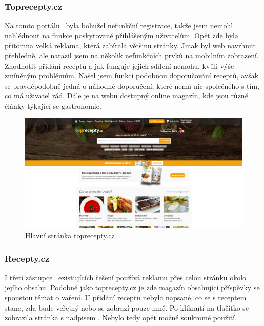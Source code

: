 \subsubsection{Toprecepty.cz}

Na tomto portálu~\cite{TopreceptyCZ} byla bohužel nefunkční registrace, takže jsem nemohl nahlédnout na funkce poskytované přihlášeným
uživatelům. Opět zde byla přítomna velká reklama, která zabírala většinu stránky. Jinak byl web navrhnut přehledně,
ale narazil jsem na několik nefunkčních prvků na mobilním zobrazení. Zhodnotit přidání receptů a jak funguje jejich
sdílení nemohu, kvůli výše zmíněným problémům. Našel jsem funkci podobnou doporučování receptů, avšak se
pravděpodobně jedná o náhodné doporučení, které nemá nic společného s tím, co má uživatel rád. Dále je na webu dostupný
online magazín, kde jsou různé články týkající se gastronomie.

\begin{figure}[H]
    \includegraphics[width=\textwidth]{images/topreceptycz-uvodni-stranka}
    \caption{Hlavní stránka toprecepty.cz} \label{picture:topreceptycz:uvodni-stranka}
\end{figure}

\subsubsection{Recepty.cz}

I třetí zástupce~\cite{ReceptyCZ} existujících řešení používá reklamu přes celou stránku okolo jejího obsahu. Podobně jako toprecepty.cz
je zde magazín obsahující příspěvky se spoustou témat o vaření. U přidání receptu nebylo napsané, co se s receptem stane,
zda bude veřejný nebo se zobrazí pouze mně. Po kliknutí na tlačítko  se zobrazila stránka s nadpisem
. Nebylo tedy opět možné soukromé použití.

